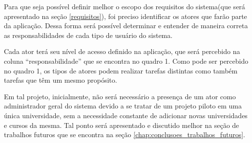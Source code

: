 Para que seja possível definir melhor o escopo dos requisitos do sistema(que será apresentado na seção \ref{requisitos}), foi preciso identificar os atores que farão parte da aplicação. Dessa forma será possível determinar e entender de maneira correta as responsabilidades de cada tipo de usuário do sistema. \par
Cada ator terá seu nível de acesso definido na aplicação, que será percebido na coluna “responsabilidade” que se encontra no quadro 1. Como pode ser percebido no quadro 1, os tipos de atores podem realizar tarefas distintas como também tarefas que têm um mesmo propósito. \par
Em tal projeto, inicialmente, não será necessário a presença de um ator como administrador geral do sistema devido a se tratar de um projeto piloto em uma única universidade, sem a necessidade constante de adicionar novas universidades e cursos da mesma. Tal ponto será apresentado e discutido melhor na seção de trabalhos futuros que se encontra na seção \ref{chap:conclusoes_trabalhos_futuros}.

\begin{table}[ht]
\centering
\caption{Tabela de atores do sistema}
\label{tab:atores}
\end{table}

